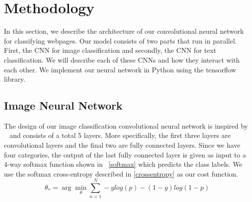 \documentclass{article} %
\newcommand{\argmin}{\arg\!\min}
\begin{document}
\clearpage
\section{Methodology}
In this section, we describe the architecture of our convolutional neural network for classifying webpages. Our model consists of two parts that run in parallel. First, the CNN for image classification and secondly, the CNN for text classification. We will describe each of these CNNs and how they interact with each other. We implement our neural network in Python using the tensorflow library.

\subsection{Image Neural Network}
The design of our image classification convolutional neural network is inspired by ~\cite{imagehinton} and consists of a total 5 layers. More specifically, the first three layers are convolutional layers and the final two are fully connected layers. Since we have four categories, the output of the last fully connected layer is given as input to a 4-way softmax function shown in ~\ref{softmax} which predicts the class labels. We use the softmax cross-entropy described in \ref{crossentropy} as our cost function.
\begin{equation} \label{crossentropy}
\theta_{*} = \argmin_\theta \sum_{n=1} ^{N} -ylog(p)-(1-y)log(1-p)
\end{equation}
\end{document}
